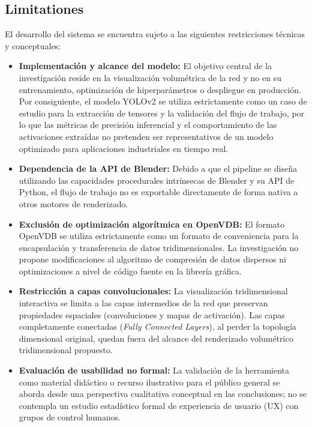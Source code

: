 \subsection{Limitationes}
El desarrollo del sistema se encuentra sujeto a las siguientes restricciones técnicas y conceptuales:
\begin{itemize}
    \item \textbf{Implementación y alcance del modelo:} El objetivo central de la investigación reside en la 
    visualización volumétrica de la red y no en su entrenamiento, optimización de hiperparámetros o 
    despliegue en producción. Por consiguiente, el modelo YOLOv2 se utiliza estrictamente como un caso de 
    estudio para la extracción de tensores y la validación del flujo de trabajo, por lo que las métricas de 
    precisión inferencial y el comportamiento de las activaciones extraídas no pretenden ser representativos 
    de un modelo optimizado para aplicaciones industriales en tiempo real.
    \item \textbf{Dependencia de la API de Blender:} Debido a que el pipeline se diseña utilizando las 
    capacidades procedurales intrínsecas de Blender y su API de Python, el flujo de trabajo no es exportable 
    directamente de forma nativa a otros motores de renderizado.
    \item \textbf{Exclusión de optimización algorítmica en OpenVDB:} El formato OpenVDB se utiliza 
    estrictamente como un formato de conveniencia para la encapsulación y transferencia de datos 
    tridimensionales. La investigación no propone modificaciones al algoritmo de compresión de datos 
    dispersos ni optimizaciones a nivel de código fuente en la librería gráfica.
    \item \textbf{Restricción a capas convolucionales:} La visualización tridimensional interactiva se 
    limita a las capas intermedios de la red que preservan propiedades espaciales (convoluciones y mapas de 
    activación). Las capas completamente conectadas (\textit{Fully Connected Layers}), al perder la topología 
    dimensional original, quedan fuera del alcance del renderizado volumétrico tridimensional propuesto.
    \item \textbf{Evaluación de usabilidad no formal:} La validación de la herramienta como material 
    didáctico o recurso ilustrativo para el público general se aborda desde una perspectiva cualitativa 
    conceptual en las conclusiones; no se contempla un estudio estadístico formal de experiencia de usuario 
    (UX) con grupos de control humanos.
\end{itemize}